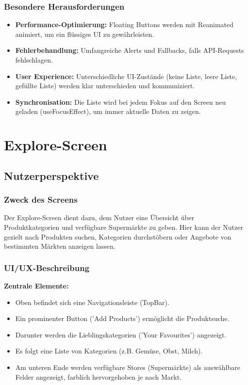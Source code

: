\documentclass[12pt, a4paper]{report} %
\begin{document}
\subsubsection{Besondere Herausforderungen}
\begin{itemize}
    \item \textbf{Performance-Optimierung:} Floating Buttons werden mit Reanimated animiert, um ein flüssiges UI zu gewährleisten.
    \item \textbf{Fehlerbehandlung:} Umfangreiche Alerts und Fallbacks, falls API-Requests fehlschlagen.
    \item \textbf{User Experience:} Unterschiedliche UI-Zustände (keine Liste, leere Liste, gefüllte Liste) werden klar unterschieden und kommuniziert.
    \item \textbf{Synchronisation:} Die Liste wird bei jedem Fokus auf den Screen neu geladen (useFocusEffect), um immer aktuelle Daten zu zeigen.
\end{itemize}

\section{Explore-Screen}
\label{sec:explore_screen}

\subsection{Nutzerperspektive}

\subsubsection{Zweck des Screens}
Der Explore-Screen dient dazu, dem Nutzer eine Übersicht über Produktkategorien und verfügbare Supermärkte zu geben. Hier kann der Nutzer gezielt nach Produkten suchen, Kategorien durchstöbern oder Angebote von bestimmten Märkten anzeigen lassen.

\subsubsection{UI/UX-Beschreibung}

\textbf{Zentrale Elemente:}
\begin{itemize}
    \item Oben befindet sich eine Navigationsleiste (TopBar).
    \item Ein prominenter Button ('Add Products') ermöglicht die Produktsuche.
    \item Darunter werden die Lieblingskategorien ('Your Favourites') angezeigt.
    \item Es folgt eine Liste von Kategorien (z.B. Gemüse, Obst, Milch).
    \item Am unteren Ende werden verfügbare Stores (Supermärkte) als auswählbare Felder angezeigt, farblich hervorgehoben je nach Markt.
\end{itemize}
\end{document}
